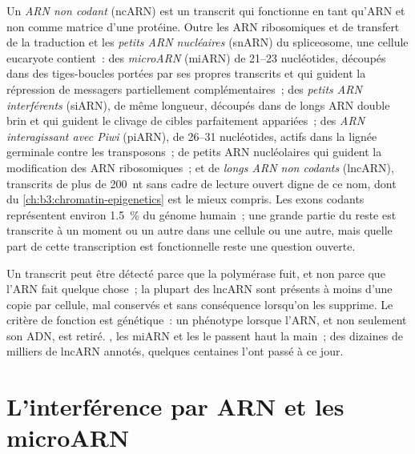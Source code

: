 \begin{definition}\label{def:b3:rna-regulation:ncrna}
Un \emph{ARN non codant} (ncARN) est un transcrit qui fonctionne en
tant qu'ARN et non comme matrice d'une protéine. Outre les ARN
ribosomiques et de transfert de la traduction et les \emph{petits ARN
nucléaires} (snARN) du spliceosome, une cellule eucaryote contient~:
des \emph{microARN} (miARN) de \numrange{21}{23} nucléotides, découpés
dans des tiges-boucles portées par ses propres transcrits et qui
guident la répression de messagers partiellement complémentaires~; des
\emph{petits ARN interférents} (siARN), de même longueur, découpés dans
de longs ARN double brin et qui guident le clivage de cibles
parfaitement appariées~; des \emph{ARN interagissant avec Piwi}
(piARN), de \numrange{26}{31} nucléotides, actifs dans la lignée
germinale contre les transposons~; de petits ARN nucléolaires qui
guident la modification des ARN ribosomiques~; et de \emph{longs ARN
non codants} (lncARN), transcrits de plus de \qty{200}{nt} sans cadre
de lecture ouvert digne de ce nom, dont \emph{} du
\cref{ch:b3:chromatin-epigenetics} est le mieux compris. Les exons
codants représentent environ \qty{1.5}{\%} du génome humain~; une
grande partie du reste est transcrite à un moment ou un autre dans une
cellule ou une autre, mais quelle part de cette transcription est
fonctionnelle reste une question ouverte.
\end{definition}

\begin{remark}\label{rem:b3:rna-regulation:function}
Un transcrit peut être détecté parce que la polymérase fuit, et non
parce que l'ARN fait quelque chose~; la plupart des lncARN sont
présents à moins d'une copie par cellule, mal conservés et sans
conséquence lorsqu'on les supprime. Le critère de fonction est
génétique~: un phénotype lorsque l'ARN, et non seulement son ADN, est
retiré. \emph{}, les miARN et les  le passent haut la main~;
des dizaines de milliers de lncARN annotés, quelques centaines l'ont
passé à ce jour.
\end{remark}

\section{L'interférence par ARN et les microARN}

